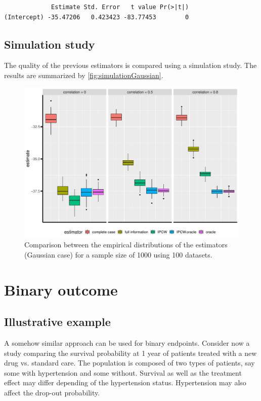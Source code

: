 \documentclass[12pt]{article}
\begin{document}
\begin{verbatim}
             Estimate Std. Error   t value Pr(>|t|)
(Intercept) -35.47206   0.423423 -83.77453        0
\end{verbatim}


\clearpage

\subsection{Simulation study}
\label{sec:org873771e}

The quality of the previous estimators is compared using a simulation
study. The results are summarized by \autoref{fig:simulationGaussian}.

\begin{figure}[!h]
\centering
\includegraphics[width=\textwidth]{./figures/simStudy-bias.pdf}
\caption{\label{fig:simulationGaussian}Comparison between the empirical distributions of the estimators (Gaussian case) for a sample size of 1000 using 100 datasets.}
\end{figure}

\bigskip

\section{Binary outcome}
\label{sec:org0e97245}

\subsection{Illustrative example}
\label{sec:org6e6b4dd}
A somehow similar approach can be used for binary endpoints. Consider
now a study comparing the survival probability at 1 year of patients
treated with a new drug vs. standard care. The population is composed
of two types of patients, say some with hypertension and some
without. Survival as well as the treatment effect may differ depending
of the hypertension status. Hypertension may also affect the drop-out
probability.
\end{document}
